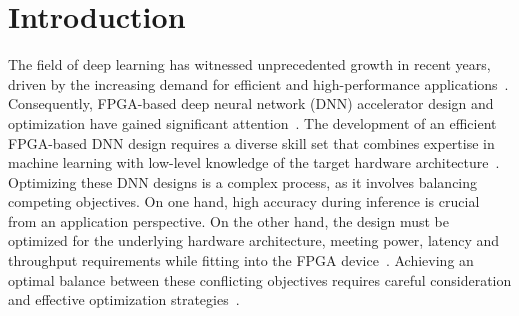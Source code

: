 




\section{Introduction}



The field of deep learning has witnessed unprecedented growth in recent years, driven by the increasing demand for efficient and high-performance applications~\cite{lecun2015deep}. Consequently, FPGA-based deep neural network (DNN) accelerator design and optimization have gained significant attention~\cite{zhang2015optimizing, zhang2020dnnexplorer}. The development of an efficient FPGA-based DNN design requires a diverse skill set that combines expertise in machine learning with low-level knowledge of the target hardware architecture~\cite{sze2017efficient}. Optimizing these DNN designs is a complex process, as it involves balancing competing objectives. On one hand, high accuracy during inference is crucial from an application perspective. On the other hand, the design must be optimized for the underlying hardware architecture, meeting power, latency and throughput requirements while fitting into the FPGA device~\cite{duarte2018fast,  coelho2021automatic}. Achieving an optimal balance between these conflicting objectives requires careful consideration and effective optimization strategies~\cite{wang2019deep}. 

